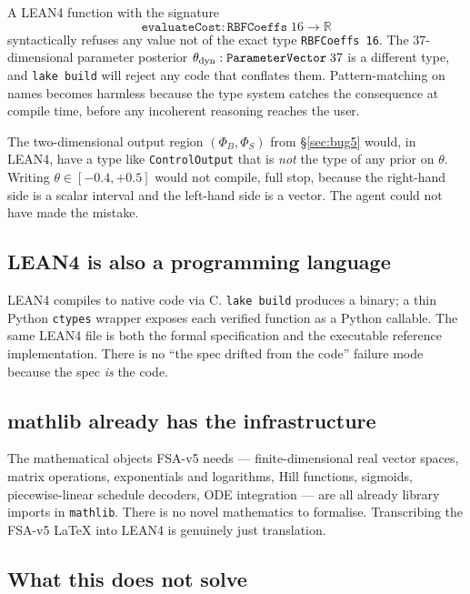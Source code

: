 \documentclass[11pt,a4paper]{article}
\begin{document}
A LEAN4 function with the signature
\[
\texttt{evaluateCost} : \texttt{RBFCoeffs}\;16 \to \mathbb{R}
\]
syntactically refuses any value not of the exact type
\texttt{RBFCoeffs 16}. The 37-dimensional parameter posterior
$\theta_{\rm dyn} : \texttt{ParameterVector}\;37$ is a different
type, and \texttt{lake build} will reject any code that conflates
them. Pattern-matching on names becomes harmless because the type
system catches the consequence at compile time, before any
incoherent reasoning reaches the user.

The two-dimensional output region $(\Phi_B, \Phi_S)$ from
§\ref{sec:bug5} would, in LEAN4, have a type like
\texttt{ControlOutput} that is \emph{not} the type of any prior on
$\theta$. Writing $\theta \in [-0.4, +0.5]$ would not compile, full
stop, because the right-hand side is a scalar interval and the
left-hand side is a vector. The agent could not have made the
mistake.

\subsection{LEAN4 is also a programming language}

LEAN4 compiles to native code via C. \texttt{lake build} produces
a binary; a thin Python \texttt{ctypes} wrapper exposes each
verified function as a Python callable. The same LEAN4 file is
both the formal specification and the executable reference
implementation. There is no ``the spec drifted from the code''
failure mode because the spec \emph{is} the code.

\subsection{mathlib already has the infrastructure}

The mathematical objects FSA-v5 needs ---
finite-dimensional real vector spaces, matrix operations,
exponentials and logarithms, Hill functions, sigmoids,
piecewise-linear schedule decoders, ODE integration --- are all
already library imports in \texttt{mathlib}. There is no novel
mathematics to formalise. Transcribing the FSA-v5 LaTeX into LEAN4
is genuinely just translation.

\subsection{What this does not solve}
\end{document}
